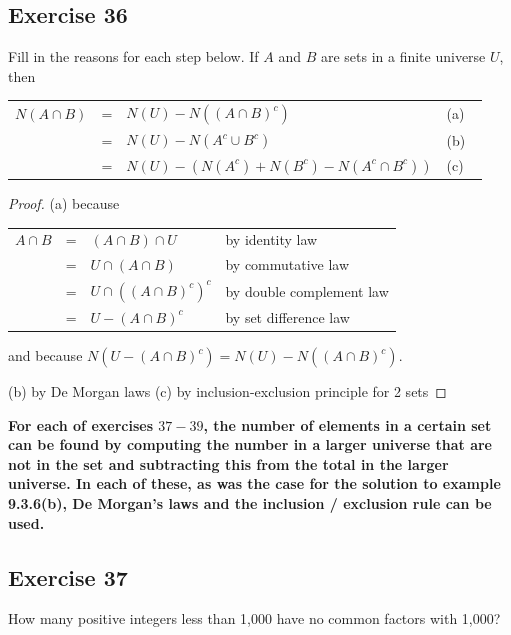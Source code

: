 \documentclass[14pt]{extarticle}
\newcommand{\fbl}{\underline{\hspace{1cm}}\,\,}
\newcommand{\cy}{\color{cyan}}
\begin{document}
\subsection{Exercise 36}
Fill in the reasons for each step below. If $A$ and $B$ are sets in a finite universe $U$, then
\begin{center}
     \begin{tabular}{rcll}
          \(N(A \cap B)\) & = & \(N(U) - N((A \cap B)^c)\)                     & {\cy (a) \fbl} \\
                          & = & \(N(U) - N(A^c \cup B^c)\)                     & {\cy (b) \fbl} \\
                          & = & \(N(U) - (N(A^c) + N(B^c) - N(A^c \cap B^c))\) & {\cy (c) \fbl}
     \end{tabular}
\end{center}
\begin{proof}
     (a) because
     \begin{center}
          \begin{tabular}{rcll}
               \(A \cap B\) & = & \((A \cap B) \cap U\)       & {\cy by identity law}          \\
                            & = & \(U \cap (A \cap B)\)       & {\cy by commutative law}       \\
                            & = & \(U \cap ((A \cap B)^c)^c\) & {\cy by double complement law} \\
                            & = & \(U - (A \cap B)^c\)        & {\cy by set difference law}    \\
          \end{tabular}
     \end{center}
     and because \(N(U - (A \cap B)^c) = N(U) - N((A \cap B)^c)\).

     (b) by De Morgan laws (c) by inclusion-exclusion principle for 2 sets
\end{proof}

{\bf \cy For each of exercises $37-39$, the number of elements in a certain set can be found by computing the
number in a larger universe that are not in the set and subtracting this from the total in the larger universe. In
each of these, as was the case for the solution to example 9.3.6(b), De Morgan’s laws and the inclusion / exclusion
rule can be used.}

\subsection{Exercise 37}
How many positive integers less than 1,000 have no common factors with 1,000?
\end{document}
